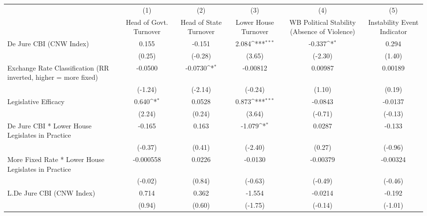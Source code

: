 {
\def\sym#1{\ifmmode^{#1}\else\(^{#1}\)\fi}
\begin{longtable}{l*{5}{c}}
\hline\hline\endfirsthead\hline\endhead\hline\endfoot\endlastfoot
                &\multicolumn{1}{c}{(1)}&\multicolumn{1}{c}{(2)}&\multicolumn{1}{c}{(3)}&\multicolumn{1}{c}{(4)}&\multicolumn{1}{c}{(5)}\\
                &\multicolumn{1}{c}{Head of Govt. Turnover}&\multicolumn{1}{c}{Head of State Turnover}&\multicolumn{1}{c}{Lower House Turnover}&\multicolumn{1}{c}{WB Political Stability (Absence of Violence)}&\multicolumn{1}{c}{Instability Event Indicator}\\
\hline
De Jure CBI (CNW Index)&    0.155         &   -0.151         &    2.084\sym{***}&   -0.337\sym{*}  &    0.294         \\
                &   (0.25)         &  (-0.28)         &   (3.65)         &  (-2.30)         &   (1.40)         \\
[1em]
Exchange Rate Classification (RR inverted, higher = more fixed)&  -0.0500         &  -0.0730\sym{*}  & -0.00812         &  0.00987         &  0.00189         \\
                &  (-1.24)         &  (-2.14)         &  (-0.24)         &   (1.10)         &   (0.19)         \\
[1em]
Legislative Efficacy&    0.640\sym{*}  &   0.0528         &    0.873\sym{***}&  -0.0843         &  -0.0137         \\
                &   (2.24)         &   (0.24)         &   (3.64)         &  (-0.71)         &  (-0.13)         \\
[1em]
De Jure CBI * Lower House Legislates in Practice&   -0.165         &    0.163         &   -1.079\sym{*}  &   0.0287         &   -0.133         \\
                &  (-0.37)         &   (0.41)         &  (-2.40)         &   (0.27)         &  (-0.96)         \\
[1em]
More Fixed Rate * Lower House Legislates in Practice&-0.000558         &   0.0226         &  -0.0130         & -0.00379         & -0.00324         \\
                &  (-0.02)         &   (0.84)         &  (-0.63)         &  (-0.49)         &  (-0.46)         \\
[1em]
L.De Jure CBI (CNW Index)&    0.714         &    0.362         &   -1.554         &  -0.0214         &   -0.192         \\
                &   (0.94)         &   (0.60)         &  (-1.75)         &  (-0.14)         &  (-1.01)         \\

\end{longtable}}
